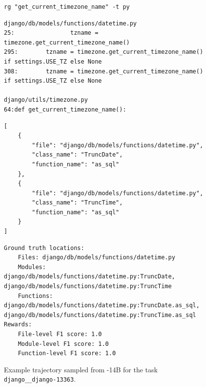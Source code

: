 \begin{figure}[!ht]

\begin{tcolorbox}[colback=blue!3!white, colframe=blue!75!black, title={\small Action 3 (Terminal Tool)}]
\begin{lstlisting}[basicstyle=\fontsize{7.5}{8.5}\ttfamily, breaklines=true]
rg "get_current_timezone_name" -t py
\end{lstlisting}
\end{tcolorbox}

\begin{tcolorbox}[colback=orange!5!white, colframe=orange!75!black, title={\small Observation 3}]
\begin{lstlisting}[basicstyle=\fontsize{7.5}{8.5}\ttfamily, breaklines=true]
django/db/models/functions/datetime.py
25:                tzname = timezone.get_current_timezone_name()
295:        tzname = timezone.get_current_timezone_name() if settings.USE_TZ else None
308:        tzname = timezone.get_current_timezone_name() if settings.USE_TZ else None

django/utils/timezone.py
64:def get_current_timezone_name():
\end{lstlisting}
\end{tcolorbox}

\begin{tcolorbox}[colback=blue!3!white, colframe=blue!75!black, title={\small Action 4 (Localization Finish Tool - Agent Loop Terminated)}]
\begin{lstlisting}[basicstyle=\fontsize{7.5}{8.5}\ttfamily, breaklines=true]
[
    {
        "file": "django/db/models/functions/datetime.py",
        "class_name": "TruncDate",
        "function_name": "as_sql"
    },
    {
        "file": "django/db/models/functions/datetime.py",
        "class_name": "TruncTime",
        "function_name": "as_sql"
    }
]
\end{lstlisting}
\end{tcolorbox}

\begin{tcolorbox}[colback=violet!3!white, colframe=violet!75!black, title={\small Reward Computation}]
\begin{lstlisting}[basicstyle=\fontsize{7.5}{8.5}\ttfamily, breaklines=true]
Ground truth locations:
    Files: django/db/models/functions/datetime.py
    Modules: django/db/models/functions/datetime.py:TruncDate, django/db/models/functions/datetime.py:TruncTime
    Functions: django/db/models/functions/datetime.py:TruncDate.as_sql, django/db/models/functions/datetime.py:TruncTime.as_sql
Rewards:
    File-level F1 score: 1.0
    Module-level F1 score: 1.0
    Function-level F1 score: 1.0
\end{lstlisting}
\end{tcolorbox}
\caption{Example trajectory sampled from \methodname-14B for the task \texttt{django\_\_django-13363}.}
\label{fig:traj_14b_p2}
\end{figure}

